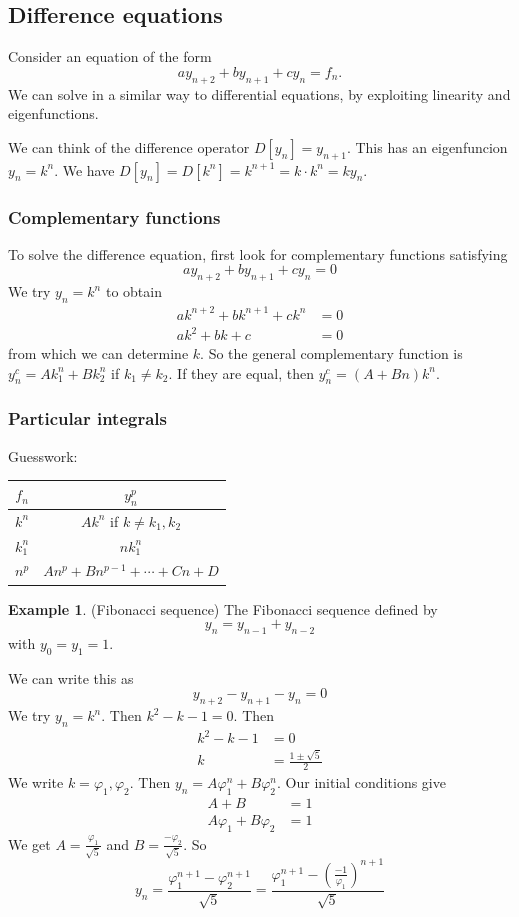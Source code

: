 \documentclass[a4paper]{article}
\theoremstyle{definition}
\newtheorem*{eg}{Example}
\begin{document}
\subsection{Difference equations}
Consider an equation of the form
\[
a y_{n + 2} + by_{n + 1} + cy_n = f_n.
\]
We can solve in a similar way to differential equations, by exploiting linearity and eigenfunctions.

We can think of the difference operator $D[y_n] = y_{n + 1}$. This has an eigenfuncion $y_n = k^n$. We have $D[y_n] = D[k^n] = k^{n + 1} = k\cdot k^n = ky_n$.

\subsubsection{Complementary functions}
To solve the difference equation, first look for complementary functions satisfying
\[
ay_{n + 2} + by_{n + 1} + cy_n = 0
\]
We try $y_n = k^n$ to obtain
\begin{align*}
  ak^{n + 2} + bk^{n + 1} + ck^n &= 0\\
  ak^2 + bk + c &= 0
\end{align*}
from which we can determine $k$. So the general complementary function is $y_n^c = Ak_1^n + Bk_2^n$ if $k_1 \not= k_2$. If they are equal, then $y_n^c = (A + Bn)k^n$.
\subsubsection{Particular integrals}
Guesswork:

\vspace{4pt}
\noindent\begin{tabular}{cc}
\toprule
$f_n$ & $y_n^p$\\
\midrule
$k^n$ & $Ak^n$ if $k \not= k_1, k_2$\\
$k_1^n$ & $nk_1^n$\\
$n^p$ & $An^p + Bn^{p - 1} + \cdots + Cn + D$\\
\bottomrule
\end{tabular}

\begin{eg}
  (Fibonacci sequence) The Fibonacci sequence defined by
  \[
  y_n = y_{n - 1} + y_{n - 2}
  \]
  with $y_0 = y_1 = 1$.

  We can write this as
  \[
  y_{n + 2} - y_{n + 1} - y_n = 0
  \]
  We try $y_n = k^n$. Then $k^2 - k - 1 = 0$. Then
  \begin{align*}
    k^2 - k - 1 &= 0\\
    k &= \frac{1 \pm \sqrt{5}}{2}
  \end{align*}
  We write $k = \varphi_1, \varphi_2$. Then $y_n = A\varphi_1^n + B\varphi_2^n$. Our initial conditions give
  \begin{align*}
    A + B &= 1\\
    A\varphi_1 + B\varphi_2 &= 1
  \end{align*}
  We get $\displaystyle A = \frac{\varphi_1}{\sqrt{5}}$ and $\displaystyle B = \frac{-\varphi_2}{\sqrt{5}}$. So
  \[
  y_n = \frac{\varphi_1^{n + 1} - \varphi_2^{n + 1}}{\sqrt{5}} = \frac{\varphi_1^{n + 1} - \left(\frac{-1}{\varphi_1}\right)^{n + 1}}{\sqrt{5}}
  \]
\end{eg}
\end{document}
